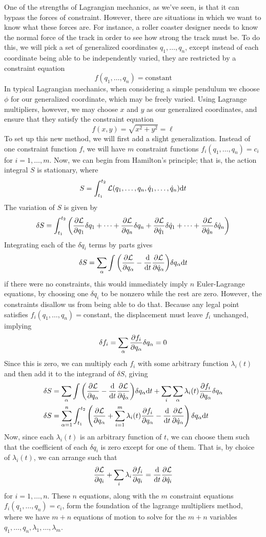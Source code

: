 One of the strengths of Lagrangian mechanics, as we've seen, is that it can bypass the forces of constraint. However, there are situations in which we want to know what these forces are. For instance, a roller coaster designer needs to know the normal force of the track in order to see how strong the track must be. To do this, we will pick a set of generalized coordinates $q_1, \dots, q_n$, except instead of each coordinate being able to be independently varied, they are restricted by a constraint equation
\[ f(q_1, \dots, q_n) = \text{constant} \]
In typical Lagrangian mechanics, when considering a simple pendulum we choose $\phi$ for our generalized coordinate, which may be freely varied. Using Lagrange multipliers, however, we may choose $x$ and $y$ as our generalized coordinates, and ensure that they satisfy the constraint equation
\[ f(x,y) = \sqrt{x^2+y^2} = \ell \]
To set up this new method, we will first add a slight generalization. Instead of one constraint function $f$, we will have $m$ constraint functions $f_i(q_1, \dots, q_n) = c_i$ for $i = 1, \dots, m$. Now, we can begin from Hamilton's principle; that is, the action integral $S$ is stationary, where
\[ S = \int_{t_1}^{t_2} \mathcal{L}(q_1, \dots, q_n, \dot q_1, \dots, \dot q_n) \dd t \]
The variation of $S$ is given by
\[ \delta S = \int_{t_1}^{t_2} \pqty{\pdv{\L}{q_1}\delta q_1 + \cdots + \pdv{\L}{q_n}\delta q_n + \pdv{\L}{\dot q_1}\delta \dot q_1 + \cdots + \pdv{\L}{\dot q_n}\delta \dot q_n}\]
Integrating each of the $\delta \dot q_i$ terms by parts gives
\[ \delta S = \sum_\alpha \int \pqty{\pdv{\L}{q_\alpha} - \dv{t} \pdv{\L}{\dot q_\alpha}}\delta q_\alpha \dd t\]
if there were no constraints, this would immediately imply $n$ Euler-Lagrange equations, by choosing one $\delta q_i$ to be nonzero while the rest are zero. However, the constraints disallow us from being able to do that. Because any legal point satisfies $f_i(q_1, \dots, q_n) = $constant, the displacement must leave $f_i$ unchanged, implying
\[ \delta f_i = \sum_\alpha \pdv{f_i}{q_\alpha}\delta q_\alpha = 0 \]
Since this is zero, we can multiply each $f_i$ with some arbitrary function $\lambda_i(t)$ and then add it to the integrand of $\delta S$, giving
\begin{align*}
    \delta S &= \sum_\alpha \int \pqty{\pdv{\L}{q_\alpha} - \dv{t} \pdv{\L}{\dot q_\alpha}}\delta q_\alpha \dd t + \sum_i\sum_\alpha \lambda_i(t)\pdv{f_i}{q_\alpha}\delta q_\alpha \\
    \delta S &= \sum_{\alpha=1}^n \int_{t_1}^{t_2} \pqty{\pdv{\L}{q_\alpha} + \sum_{i=1}^m\lambda_i(t) \pdv{f_i}{q_\alpha} - \dv{t}\pdv{\L}{\dot q_\alpha}}\, \delta q_\alpha \dd t
\end{align*}
Now, since each $\lambda_i(t)$ is an arbitrary function of $t$, we can choose them such that the coefficient of each $\delta q_i$ is zero except for one of them. That is, by choice of $\lambda_i(t)$, we can arrange such that
\[ \pdv{\mathcal{L}}{q_i} + \sum_i \lambda_i \pdv{f_i}{q_i} = \dv{t}\pdv{\mathcal{L}}{\dot q_i} \]
for $i = 1, \dots, n$. These $n$ equations, along with the $m$ constraint equations $f_i(q_1, \dots, q_n) = c_i$, form the foundation of the lagrange multipliers method, where we have $m+n$ equations of motion to solve for the $m+n$ variables $q_1, \dots, q_n, \lambda_1, \dots, \lambda_m$.

